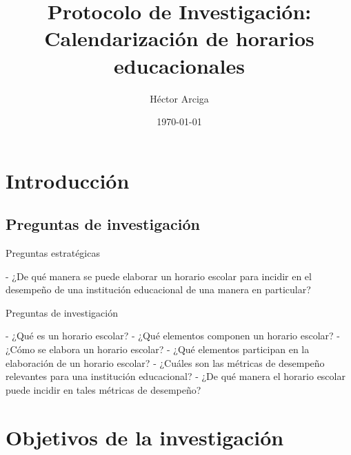 \documentclass[draft,12pt,headsepline,footsepline,paper=letter]{scrreprt}
\begin{document}
\title{Protocolo de Investigación: Calendarización de horarios educacionales}
\author{Héctor Arciga}
\date{\today}

\maketitle

\begin{spacing}{1}
\tableofcontents
\glsaddall 
\printglossaries
\listoffigures
\listoftables
\end{spacing}


\chapter{Introducción}


\section{Preguntas de investigación}

Preguntas estratégicas

- ¿De qué manera se puede elaborar un horario escolar para incidir en el desempeño de una institución educacional de una manera en particular?

Preguntas de investigación

- ¿Qué es un horario escolar?
- ¿Qué elementos componen un horario escolar?
- ¿Cómo se elabora un horario escolar? 
- ¿Qué elementos participan en la elaboración de un horario escolar?
- ¿Cuáles son las métricas de desempeño relevantes para una institución educacional?
- ¿De qué manera el horario escolar puede incidir en tales métricas de desempeño?

\chapter{Objetivos de la investigación}
\end{document}
